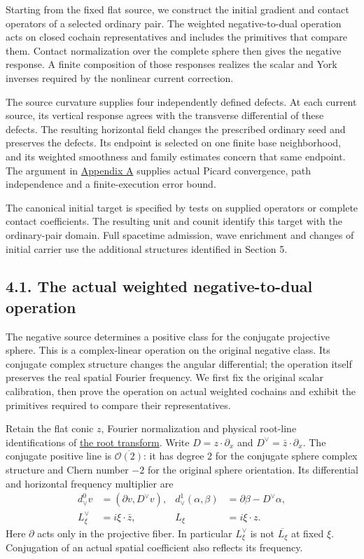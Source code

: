 \documentclass[
  english,
  11pt,
  reqno]{amsart}
\begin{document}
Starting from the fixed flat source, we construct the initial gradient
and contact operators of a selected ordinary pair. The weighted
negative-to-dual operation acts on closed cochain representatives and
includes the primitives that compare them. Contact normalization over
the complete sphere then gives the negative response. A finite
composition of those responses realizes the scalar and York inverses
required by the nonlinear current correction.

The source curvature supplies four independently defined defects. At
each current source, its vertical response agrees with the transverse
differential of these defects. The resulting horizontal field changes
the prescribed ordinary seed and preserves the defects. Its endpoint is
selected on one finite base neighborhood, and its weighted smoothness
and family estimates concern that same endpoint. The argument in
\hyperref[sec:online-current-flat-input-transport]{Appendix A} supplies
actual Picard convergence, path independence and a finite-execution
error bound.

The canonical initial target is specified by tests on supplied operators
or complete contact coefficients. The resulting unit and counit identify
this target with the ordinary-pair domain. Full spacetime admission,
wave enrichment and changes of initial carrier use the additional
structures identified in Section 5.

\subsection{4.1. The actual weighted negative-to-dual
operation}\label{the-actual-weighted-negative-to-dual-operation}\label{sec:online-actual-negative-dual}

The negative source determines a positive class for the conjugate
projective sphere. This is a complex-linear operation on the original
negative class. Its conjugate complex structure changes the angular
differential; the operation itself preserves the real spatial Fourier
frequency. We first fix the original scalar calibration, then prove the
operation on actual weighted cochains and exhibit the primitives
required to compare their representatives.

Retain the flat conic \(z\), Fourier normalization and physical
root-line identifications of
\hyperref[sec:online-root-calibration-and-seeds]{the root transform}.
Write \(D=z\cdot\partial_x\) and \(D^\vee=\bar z\cdot\partial_x\). The
conjugate positive line is \(\overline{\mathcal O(2)}\): it has degree
\(2\) for the conjugate sphere complex structure and Chern number \(-2\)
for the original sphere orientation. Its differential and horizontal
frequency multiplier are%
 \[
\begin{aligned}
d_\vee^0v&=(\partial v,D^\vee v),&
d_\vee^1(\alpha,\beta)&=\partial\beta-D^\vee\alpha,\\
L_\xi^\vee&=i\xi\cdot\bar z,&
L_\xi&=i\xi\cdot z .
\end{aligned}
\] Here \(\partial\) acts only in the projective fiber. In particular
\(L_\xi^\vee\) is not \(\overline{L_\xi}\) at fixed \(\xi\). Conjugation
of an actual spatial coefficient also reflects its frequency.
\end{document}
